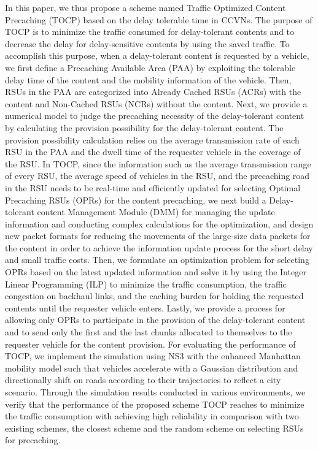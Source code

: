 \documentclass{ieeeaccess}
\begin{document}
In this paper, we thus propose a scheme named Traffic Optimized Content Precaching (TOCP) based on the delay tolerable time in CCVNs.
The purpose of TOCP is to minimize the traffic consumed for delay-tolerant contents and to decrease the delay for delay-sensitive contents by using the saved traffic.
To accomplish this purpose, when a delay-tolerant content is requested by a vehicle, we first define a Precaching Available Area (PAA) by exploiting the tolerable delay time of the content and the mobility information of the vehicle.
Then, RSUs in the PAA are categorized into Already Cached RSUs (ACRs) with the content and Non-Cached RSUs (NCRs) without the content.
Next, we provide a numerical model to judge the precaching necessity of the delay-tolerant content by calculating the provision possibility for the delay-tolerant content.
The provision possibility calculation relies on the average transmission rate of each RSU in the PAA and the dwell time of the requester vehicle in the coverage of the RSU.
In TOCP, since the information such as the average transmission range of every RSU, the average speed of vehicles in the RSU, and the precaching road in the RSU needs to be real-time and efficiently updated for selecting Optimal Precaching RSUs (OPRs) for the content precaching, we next build a Delay-tolerant content Management Module (DMM) for managing the update information and conducting complex calculations for the optimization, and design new packet formats for reducing the movements of the large-size data packets for the content in order to achieve the information update process for the short delay and small traffic costs.
Then, we formulate an optimization problem for selecting OPRs based on the latest updated information and solve it by using the Integer Linear Programming (ILP) to minimize the traffic consumption, the traffic congestion on backhaul links, and the caching burden for holding the requested contents until the requester vehicle enters.
Lastly, we provide a process for allowing only OPRs to participate in the provision of the delay-tolerant content and to send only the first and the last chunks allocated to themselves to the requester vehicle for the content provision.
For evaluating the performance of TOCP, we implement the simulation using NS3 with the enhanced Manhattan mobility model such that vehicles accelerate with a Gaussian distribution and directionally shift on roads according to their trajectories to reflect a city scenario.
Through the simulation results conducted in various environments, we verify that the performance of the proposed scheme TOCP reaches to minimize the traffic consumption with achieving high reliability in comparison with two existing schemes, the closest scheme and the random scheme on selecting RSUs for precaching.
\end{document}

